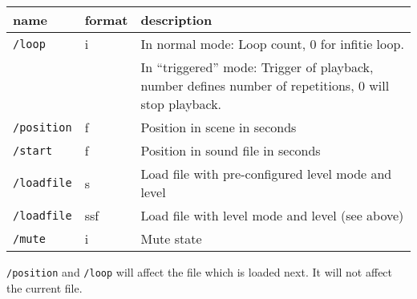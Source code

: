 \begin{tabularx}{\textwidth}{llX}
\hline
name            & format & description                                                                                             \\
\hline
{\tt /loop}     & i      & In normal mode: Loop count, 0 for infitie loop.                                                         \\
                &        & In ``triggered'' mode: Trigger of playback, number defines number of repetitions, 0 will stop playback. \\
{\tt /position} & f      & Position in scene in seconds                                                                            \\
{\tt /start}    & f      & Position in sound file in seconds                                                                       \\
{\tt /loadfile} & s      & Load file with pre-configured level mode and level                                                      \\
{\tt /loadfile} & ssf    & Load file with level mode and level (see above)                                                         \\
{\tt /mute}     & i      & Mute state                                                                                              \\
\hline
\end{tabularx}

\verb!/position! and \verb!/loop! will affect the file which is loaded next. It will not affect the current file.
